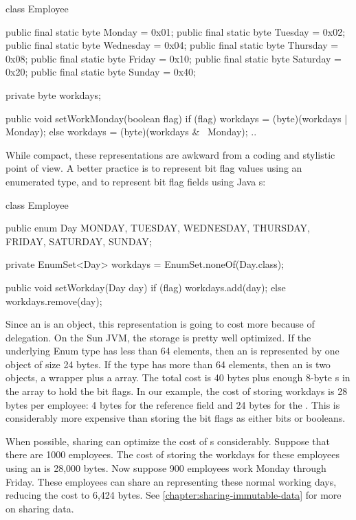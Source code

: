 \begin{shortlisting}
	class Employee {
	
		public final static byte Monday = 0x01;
		public final static byte Tuesday = 0x02;
		public final static byte Wednesday = 0x04;
		public final static byte Thursday = 0x08;
		public final static byte Friday = 0x10;
		public final static byte Saturday = 0x20;
		public final static byte Sunday = 0x40;
		
		private byte workdays;
		
		public void setWorkMonday(boolean flag) {
			if (flag) {
				workdays = (byte)(workdays | Monday);
			} else {
				workdays = (byte)(workdays & ~Monday);
			}
		}
		..
   }
		       
\end{shortlisting}

While compact, these representations are awkward from a coding and
stylistic point of view. A better practice is to represent bit flag values
using an enumerated type, and to represent bit flag fields using Java
s:
\begin{shortlisting}

    class Employee {
 
		public enum Day {MONDAY, TUESDAY, WEDNESDAY, THURSDAY, FRIDAY, SATURDAY, SUNDAY};
    	
    	private EnumSet<Day> workdays = EnumSet.noneOf(Day.class);
    
   	 	public void setWorkday(Day day) {
			if (flag) {
				workdays.add(day);
			} else {
				workdays.remove(day);
			}
		}
	}
    
    
\end{shortlisting}

Since an  is an object, this representation is going to
cost more because of delegation. On the Sun JVM, the storage is pretty
well optimized. If the underlying Enum type has less than 64 elements, then an
 is represented by one object of size 24 bytes. If the
 type has more than 64 elements, then an  is two objects, a wrapper plus a
 array. The total cost is 40 bytes plus enough 8-byte
s in the array to hold the bit flags. In our example, the cost of storing workdays is 28 bytes per employee:
4 bytes for the reference field and 24 bytes for the . This is considerably
more expensive than storing the bit flags as either bits or booleans. 

When possible, sharing can optimize the cost of 
 s considerably. Suppose
that there are 1000 employees. The cost of storing the workdays for these
employees using an  is 28,000 bytes. 
Now suppose 900 employees work Monday
through Friday. These employees can share an  representing
these normal working days, reducing the cost to 6,424 bytes.  See \autoref{chapter:sharing-immutable-data}
for more on sharing data.


